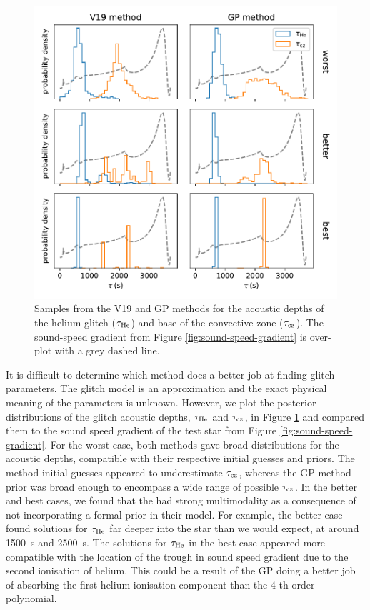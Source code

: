 \begin{figure}
    \centering
    \includegraphics{figures/glitch-test-tau.pdf}
    \caption{Samples from the V19 and GP methods for the acoustic depths of the helium glitch (\(\tau_{{\mathrm{He}}}\)) and base of the convective zone (\(\tau_{{\mathrm{cz}}}\)). The sound-speed gradient from Figure \ref{fig:sound-speed-gradient} is over-plot with a grey dashed line.}
    \label{fig:glitch-test-tau}
\end{figure}

It is difficult to determine which method does a better job at finding glitch parameters. The glitch model is an approximation and the exact physical meaning of the parameters is unknown. However, we plot the posterior distributions of the glitch acoustic depths, \(\tau_{{\mathrm{He}}}\) and \(\tau_{{\mathrm{cz}}}\), in Figure \ref{fig:glitch-test-tau} and compared them to the sound speed gradient of the test star from Figure \ref{fig:sound-speed-gradient}. For the worst case, both methods gave broad distributions for the acoustic depths, compatible with their respective initial guesses and priors. The  method initial guesses appeared to underestimate \(\tau_{{\mathrm{cz}}}\), whereas the GP method prior was broad enough to encompass a wide range of possible \(\tau_{{\mathrm{cz}}}\). In the better and best cases, we found that the  had strong multimodality as a consequence of not incorporating a formal prior in their model. For example, the better case found solutions for \(\tau_{{\mathrm{He}}}\) far deeper into the star than we would expect, at around \SI{1500}{\second} and \SI{2500}{\second}. The solutions for \(\tau_{{\mathrm{He}}}\) in the best case appeared more compatible with the location of the trough in sound speed gradient due to the second ionisation of helium. This could be a result of the GP doing a better job of absorbing the first helium ionisation component than the 4-th order polynomial.

